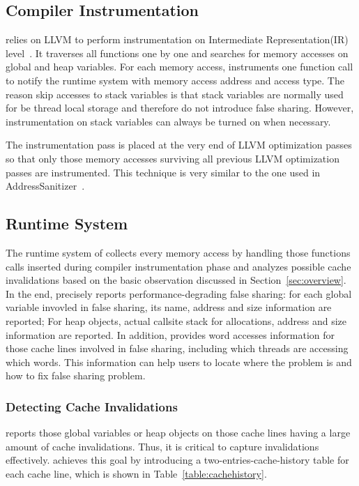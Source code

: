 \subsection{Compiler Instrumentation}
\label{sec:compiler}

\Defaults{} relies on LLVM to perform instrumentation on Intermediate Representation(IR) level~\cite{llvm}.
It traverses all functions one by one and 
searches for memory accesses on global and heap variables. 
For each memory access,  instruments one function call to 
notify the runtime system with memory access address and access type.
The reason \Defaults{} skip accesses to stack variables 
is that stack variables are normally used for be thread local storage and
therefore do not introduce false sharing. However, instrumentation on stack
variables can always be turned on when necessary. 

The instrumentation pass is placed at the very end of LLVM optimization passes 
so that only those memory accesses surviving all previous 
LLVM optimization passes are instrumented. 
This  technique is very similar to the one used in AddressSanitizer~\cite{Addresssanitizer}.

\subsection{Runtime System}
\label{sec:runtime}
The runtime system of  collects every memory access by handling 
those functions calls inserted during compiler instrumentation phase and analyzes
possible cache invalidations based on the basic observation discussed in Section~\ref{sec:overview}.
In the end,  precisely reports performance-degrading false sharing:
for each global variable invovled in false sharing, its name, address and size
information are reported; For heap objects, actual callsite stack for allocations, address 
and size information are reported.
In addition,  provides word accesses information for those cache lines 
involved in false sharing, including which threads are accessing which words. 
This information can help 
users to locate where the problem is and how to fix false sharing problem.

\subsubsection{Detecting Cache Invalidations}
\Defaults{} reports those global variables or heap objects on those cache lines 
having a large amount of cache invalidations. 
Thus, it is critical to capture invalidations effectively. 
\Defaults{} achieves this goal by introducing a  
two-entries-cache-history table for each cache line, which is 
shown in Table~\ref{table:cachehistory}. 

